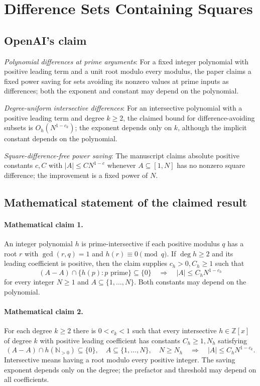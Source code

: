 \documentclass[11pt]{article}
\begin{document}
\section*{Difference Sets Containing Squares}

\subsection{OpenAI's claim}
\textit{Polynomial differences at prime arguments}: For a fixed integer polynomial with positive leading term and a unit root modulo every modulus, the paper claims a fixed power saving for sets avoiding its nonzero values at prime inputs as differences; both the exponent and constant may depend on the polynomial.

\textit{Degree-uniform intersective differences}: For an intersective polynomial with a positive leading term and degree $k\ge2$, the claimed bound for difference-avoiding subsets is $O_h(N^{1-c_k})$; the exponent depends only on $k$, although the implicit constant depends on the polynomial.

\textit{Square-difference-free power saving}: The manuscript claims absolute positive constants $c,C$ with $|A|\le C N^{1-c}$ whenever $A\subseteq[1,N]$ has no nonzero square difference; the improvement is a fixed power of $N$.

\subsection{Mathematical statement of the claimed result}
\paragraph{Mathematical claim 1.} An integer polynomial $h$ is prime-intersective if each positive modulus $q$ has a root $r$ with $\gcd(r,q)=1$ and $h(r)\equiv0\pmod q$. If $\deg h\ge2$ and its leading coefficient is positive, then the claim supplies $c_h>0,C_h\ge1$ such that \[(A-A)\cap\{h(p):p\text{ prime}\}\subseteq\{0\}\quad\Longrightarrow\quad|A|\le C_hN^{1-c_h}\] for every integer $N\ge1$ and $A\subseteq\{1,\ldots,N\}$. Both constants may depend on the polynomial.

\paragraph{Mathematical claim 2.} For each degree $k\ge2$ there is $0<c_k<1$ such that every intersective $h\in\mathbb Z[x]$ of degree $k$ with positive leading coefficient has constants $C_h\ge1,N_h$ satisfying \[(A-A)\cap h(\mathbb N_{>0})\subseteq\{0\},\quad A\subseteq\{1,\ldots,N\},\quad N\ge N_h\quad\Longrightarrow\quad|A|\le C_hN^{1-c_k}.\] Intersective means having a root modulo every positive integer. The saving exponent depends only on the degree; the prefactor and threshold may depend on all coefficients.
\end{document}
